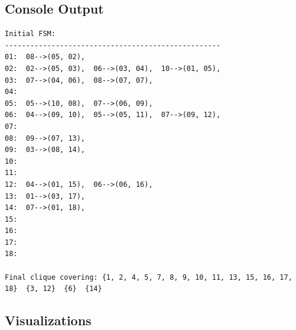 \documentclass[a4paper,10pt]{article}
\begin{document}
\subsection{Console Output}
\begin{verbatim}
Initial FSM:
---------------------------------------------------
01:  08-->(05, 02),  
02:  02-->(05, 03),  06-->(03, 04),  10-->(01, 05),  
03:  07-->(04, 06),  08-->(07, 07),  
04:  
05:  05-->(10, 08),  07-->(06, 09),  
06:  04-->(09, 10),  05-->(05, 11),  07-->(09, 12),  
07:  
08:  09-->(07, 13),  
09:  03-->(08, 14),  
10:  
11:  
12:  04-->(01, 15),  06-->(06, 16),  
13:  01-->(03, 17),  
14:  07-->(01, 18),  
15:  
16:  
17:  
18:  

Final clique covering: {1, 2, 4, 5, 7, 8, 9, 10, 11, 13, 15, 16, 17, 18}  {3, 12}  {6}  {14}  
\end{verbatim}

\subsection{Visualizations}
\end{document}
